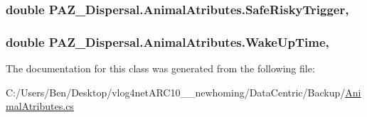 \hypertarget{class_p_a_z___dispersal_1_1_animal_atributes_af09cef843d79b8c7aa13a0f220355963}{
\subsubsection[{Safe\-Risky\-Trigger}]{\setlength{\rightskip}{0pt plus 5cm}double P\-A\-Z\-\_\-\-Dispersal.\-Animal\-Atributes.\-Safe\-Risky\-Trigger\hspace{0.3cm}{\ttfamily [get]}, {\ttfamily [set]}}}\label{class_p_a_z___dispersal_1_1_animal_atributes_af09cef843d79b8c7aa13a0f220355963}
\hypertarget{class_p_a_z___dispersal_1_1_animal_atributes_abc75a5a1f274917c4322edf45ebfdbeb}{
\subsubsection[{Wake\-Up\-Time}]{\setlength{\rightskip}{0pt plus 5cm}double P\-A\-Z\-\_\-\-Dispersal.\-Animal\-Atributes.\-Wake\-Up\-Time\hspace{0.3cm}{\ttfamily [get]}, {\ttfamily [set]}}}\label{class_p_a_z___dispersal_1_1_animal_atributes_abc75a5a1f274917c4322edf45ebfdbeb}


The documentation for this class was generated from the following file\-:\begin{DoxyCompactItemize}
\item 
C\-:/\-Users/\-Ben/\-Desktop/vlog4net\-A\-R\-C10\-\_\-\_\-newhoming/\-Data\-Centric/\-Backup/\hyperlink{_backup_2_animal_atributes_8cs}{Animal\-Atributes.\-cs}\end{DoxyCompactItemize}
